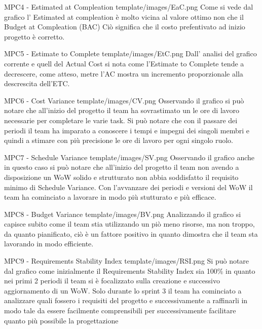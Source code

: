 \Met
{ %
    MPC4 - Estimated at Compleation
}
{ %
    template/images/EaC.png
}
{ %
    Come si vede dal grafico l' Estimated at compleation è molto vicina al valore ottimo non che il Budget at Compleation (BAC)
    Ciò significa che il costo prefentivato ad inizio progetto è corretto. 
}

\Met
{ %
    MPC5 - Estimate to Complete
}
{ %
    template/images/EtC.png
}
{ %
    Dall' analisi del grafico corrente e quell del Actual Cost si nota come l'Estimate to Complete tende a decrescere, come atteso,
    metre l'AC mostra un incremento proporzionale alla descrescita dell'ETC.
}

\Met
{ %
    MPC6 - Cost Variance
}
{ %
    template/images/CV.png
}
{ %
    Osservando il grafico si può notare che all'inizio del progetto il team ha sovrastimato un le ore di lavoro necessarie per completare
    le varie task. Si può notare che con il passare dei periodi il team ha imparato a conoscere i tempi e impegni dei singoli membri e quindi a stimare
    con più precisione le ore di lavoro per ogni singolo ruolo.
}

\Met
{ %
    MPC7 - Schedule Variance
}
{ %
    template/images/SV.png
}
{ %
    Osservando il grafico anche in questo caso si può notare che all'inizio del progetto il team non avendo a disposizione un WoW solido e strutturato 
    non abbia soddisfatto il requisito minimo di Schedule Variance. Con l'avvanzare dei periodi e versioni del WoW il team ha cominciato a lavorare in modo
    più stutturato e più efficace.
}

\Met
{ %
    MPC8 - Budget Variance
}
{ %
    template/images/BV.png
}
{ %
    Analizzando il grafico si capisce subito come il team stia utilizzando un piò meno risorse, ma non troppo, da quanto pianificato, ciò è un fattore positivo 
    in quanto dimostra che il team sta lavorando in modo efficiente.
}

\Met
{ %
    MPC9 - Requirements Stability Index
}
{ %
    template/images/RSI.png
}
{ %
    Si può notare dal grafico come inizialmente il Requirements Stability Index sia 100\% in quanto nei primi 2 periodi il team si è
    focalizzato sulla creazione e successivo aggiornamento di un WoW. Solo durante lo sprint 3 il team ha cominciato a analizzare quali fossero
    i requisiti del progetto e successivamente a raffinarli in modo tale da essere facilmente comprensibili per successivamente facilitare quanto più possibile la progettazione 
}

